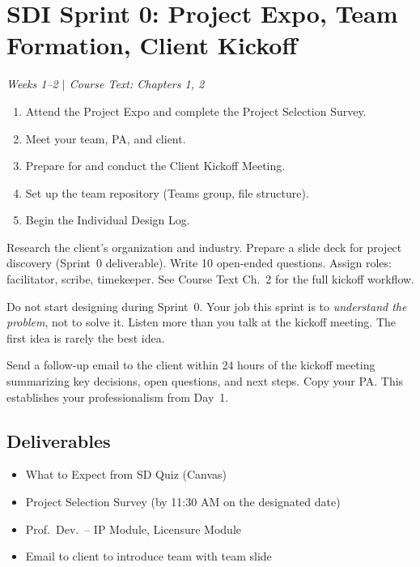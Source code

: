 \documentclass[11pt,letterpaper]{article}
\begin{document}
\section{SDI Sprint 0: Project Expo, Team Formation, Client Kickoff}
\textit{Weeks 1--2 $|$ Course Text: Chapters 1, 2}

\begin{priorities}
\begin{enumerate}[nosep]
\item Attend the Project Expo and complete the Project Selection Survey.
\item Meet your team, PA, and client.
\item Prepare for and conduct the Client Kickoff Meeting.
\item Set up the team repository (Teams group, file structure).
\item Begin the Individual Design Log.
\end{enumerate}
\end{priorities}

\begin{faqbox}
Research the client's organization and industry. Prepare a slide deck for project discovery (Sprint~0 deliverable). Write 10 open-ended questions. Assign roles: facilitator, scribe, timekeeper. See Course Text Ch.~2 for the full kickoff workflow.
\end{faqbox}

\begin{warnbox}
Do not start designing during Sprint~0. Your job this sprint is to \emph{understand the problem}, not to solve it. Listen more than you talk at the kickoff meeting. The first idea is rarely the best idea.
\end{warnbox}

\begin{protip}
Send a follow-up email to the client within 24 hours of the kickoff meeting summarizing key decisions, open questions, and next steps. Copy your PA. This establishes your professionalism from Day~1.
\end{protip}

\subsection{Deliverables}
\begin{itemize}[nosep,leftmargin=1.5em]
\item What to Expect from SD Quiz (Canvas)
\item Project Selection Survey (by 11:30 AM on the designated date)
\item Prof.~Dev.~-- IP Module, Licensure Module
\item Email to client to introduce team with team slide
\end{itemize}
\end{document}
